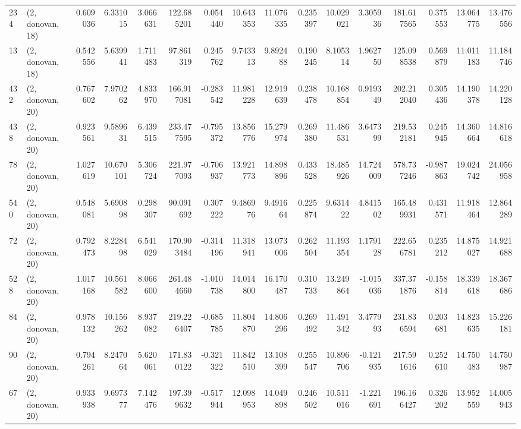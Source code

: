 \begin{tabular}{llrrrrrrrrrrrrrr}
234 &  (2, donovan, 18) &   0.609036 &   6.331015 &   3.066631 &   122.685201 &   0.054440 &  10.643353 &  11.076335 &  0.235397 &  10.029021 &   3.305936 &    181.617565 &   0.375553 &   13.064775 &   13.476556 \\
13  &  (2, donovan, 18) &   0.542556 &   5.639941 &   1.711483 &    97.861319 &   0.245762 &   9.743313 &   9.892488 &  0.190245 &   8.105314 &   1.962750 &    125.098538 &   0.569879 &   11.011183 &   11.184746 \\
432 &  (2, donovan, 20) &   0.767602 &   7.970262 &   4.833970 &   166.917081 &  -0.283542 &  11.981228 &  12.919639 &  0.238478 &  10.168854 &   0.919349 &    202.212040 &   0.305436 &   14.190378 &   14.220128 \\
438 &  (2, donovan, 20) &   0.923561 &   9.589631 &   6.439515 &   233.477595 &  -0.795372 &  13.856776 &  15.279974 &  0.269380 &  11.486531 &   3.647399 &    219.532181 &   0.245945 &   14.360664 &   14.816618 \\
78  &  (2, donovan, 20) &   1.027619 &  10.670101 &   5.306724 &   221.977093 &  -0.706937 &  13.921773 &  14.898896 &  0.433528 &  18.485926 &  14.724009 &    578.737246 &  -0.987863 &   19.024742 &   24.056958 \\
540 &  (2, donovan, 20) &   0.548081 &   5.690898 &   0.298307 &    90.091692 &   0.307222 &   9.486976 &   9.491664 &  0.225874 &   9.631422 &   4.841502 &    165.489931 &   0.431571 &   11.918464 &   12.864289 \\
72  &  (2, donovan, 20) &   0.792473 &   8.228498 &   6.541029 &   170.903484 &  -0.314196 &  11.318941 &  13.073006 &  0.262504 &  11.193354 &   1.179128 &    222.656781 &   0.235212 &   14.875027 &   14.921688 \\
528 &  (2, donovan, 20) &   1.017168 &  10.561582 &   8.066600 &   261.484660 &  -1.010738 &  14.014800 &  16.170487 &  0.310733 &  13.249864 &  -1.015036 &    337.371876 &  -0.158814 &   18.339618 &   18.367686 \\
84  &  (2, donovan, 20) &   0.978132 &  10.156262 &   8.937082 &   219.226407 &  -0.685785 &  11.804870 &  14.806296 &  0.269492 &  11.491342 &   3.477993 &    231.836594 &   0.203681 &   14.823635 &   15.226181 \\
90  &  (2, donovan, 20) &   0.794261 &   8.247064 &   5.620061 &   171.830122 &  -0.321322 &  11.842510 &  13.108399 &  0.255547 &  10.896706 &  -0.121935 &    217.591616 &   0.252610 &   14.750483 &   14.750987 \\
67  &  (2, donovan, 20) &   0.933938 &   9.697377 &   7.142476 &   197.399632 &  -0.517944 &  12.098953 &  14.049898 &  0.246502 &  10.511016 &  -1.221691 &    196.166427 &   0.326202 &   13.952559 &   14.005943 \\

\end{tabular}
